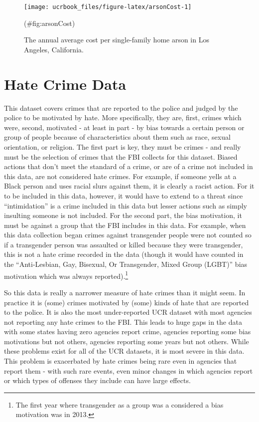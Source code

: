 \documentclass[
  12pt,
  openany]{book}
\begin{document}
\begin{figure}

{\centering \texttt{[image: ucrbook\_files/figure-latex/arsonCost-1]} 

}

\caption{The annual average cost per single-family home arson in Los Angeles, California.}(\#fig:arsonCost)
\end{figure}

\hypertarget{hate_crimes}{%
\chapter{Hate Crime Data}\label{hate_crimes}}

This dataset covers crimes that are reported to the police and judged by the police to be motivated by hate. More specifically, they are, first, crimes which were, second, motivated - at least in part - by bias towards a certain person or group of people because of characteristics about them such as race, sexual orientation, or religion. The first part is key, they must be crimes - and really must be the selection of crimes that the FBI collects for this dataset. Biased actions that don't meet the standard of a crime, or are of a crime not included in this data, are not considered hate crimes. For example, if someone yells at a Black person and uses racial slurs against them, it is clearly a racist action. For it to be included in this data, however, it would have to extend to a threat since ``intimidation'' is a crime included in this data but lesser actions such as simply insulting someone is not included. For the second part, the bias motivation, it must be against a group that the FBI includes in this data. For example, when this data collection began crimes against transgender people were not counted so if a transgender person was assaulted or killed because they were transgender, this is not a hate crime recorded in the data (though it would have counted in the ``Anti-Lesbian, Gay, Bisexual, Or Transgender, Mixed Group (LGBT)'' bias motivation which was always reported).\footnote{The first year where transgender as a group was a considered a bias motivation was in 2013.}

So this data is really a narrower measure of hate crimes than it might seem. In practice it is (some) crimes motivated by (some) kinds of hate that are reported to the police. It is also the most under-reported UCR dataset with most agencies not reporting any hate crimes to the FBI. This leads to huge gaps in the data with some states having zero agencies report crime, agencies reporting some bias motivations but not others, agencies reporting some years but not others. While these problems exist for all of the UCR datasets, it is most severe in this data. This problem is exacerbated by hate crimes being rare even in agencies that report them - with such rare events, even minor changes in which agencies report or which types of offenses they include can have large effects.
\end{document}
